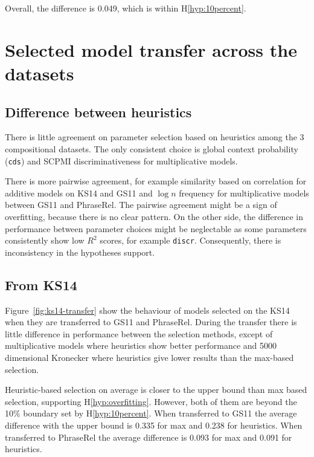 Overall, the difference is 0.049, which is within H\ref{hyp:10percent}.

\section{Selected model transfer across the datasets}
\label{sec:select-model-transf-comp}

\subsection{Difference between heuristics}
\label{sec:diff-betw-heur-comp}

There is little agreement on parameter selection based on heuristics among the 3 compositional datasets. The only consistent choice is global context probability (\texttt{cds}) and SCPMI discriminativeness for multiplicative models.

There is more pairwise agreement, for example similarity based on correlation for additive models on KS14 and GS11 and $\log n$ frequency for multiplicative models between GS11 and PhraseRel. The pairwise agreement might be a sign of overfitting, because there is no clear pattern. On the other side, the difference in performance between parameter choices might be neglectable as some parameters consistently show low $R^2$ scores, for example \texttt{discr}. Consequently, there is inconsistency in the hypotheses support.

\subsection{From KS14}
\label{sec:from-ks14}



Figure~\ref{fig:ks14-transfer} show the behaviour of models selected on the KS14 when they are transferred to GS11 and PhraseRel. During the transfer there is little difference in performance between the selection methods, except of multiplicative models where heuristics show better performance and 5000 dimensional Kronecker where heuristics give lower results than the max-based selection.

Heuristic-based selection on average is closer to the upper bound than max based selection, supporting H\ref{hyp:overfitting}. However, both of them are beyond the 10\% boundary set by H\ref{hyp:10percent}. When transferred to GS11 the average difference with the upper bound is 0.335 for max and 0.238 for heuristics. When transferred to PhraseRel the average difference is 0.093 for max and 0.091 for heuristics.

